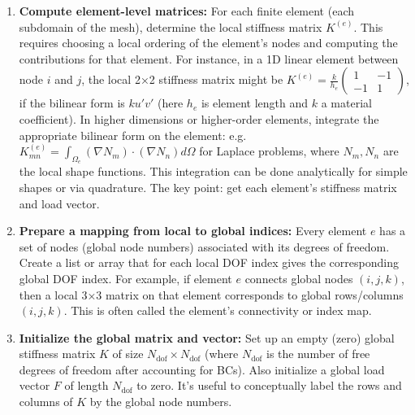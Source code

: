 \documentclass[a4paper,11pt]{report}
\begin{document}
\begin{enumerate}
    \item \textbf{Compute element-level matrices:} For each finite element (each subdomain of the mesh), determine the local stiffness matrix $K^{(e)}$. This requires choosing a local ordering of the element's nodes and computing the contributions for that element. For instance, in a 1D linear element between node $i$ and $j$, the local 2×2 stiffness matrix might be $K^{(e)} = \frac{k}{h_e} \begin{pmatrix} 1 & -1 \\ -1 & 1 \end{pmatrix}$, if the bilinear form is $k u'v'$ (here $h_e$ is element length and $k$ a material coefficient). In higher dimensions or higher-order elements, integrate the appropriate bilinear form on the element: e.g. $K^{(e)}_{mn} = \int_{\Omega_e} (\nabla N_m)\cdot(\nabla N_n) d\Omega$ for Laplace problems, where $N_m, N_n$ are the local shape functions. This integration can be done analytically for simple shapes or via quadrature. The key point: get each element's stiffness matrix and load vector.

    \item \textbf{Prepare a mapping from local to global indices:} Every element $e$ has a set of nodes (global node numbers) associated with its degrees of freedom. Create a list or array that for each local DOF index gives the corresponding global DOF index. For example, if element $e$ connects global nodes $(i, j, k)$, then a local 3×3 matrix on that element corresponds to global rows/columns $(i, j, k)$. This is often called the element's connectivity or index map.

    \item \textbf{Initialize the global matrix and vector:} Set up an empty (zero) global stiffness matrix $K$ of size $N_{\text{dof}} \times N_{\text{dof}}$ (where $N_{\text{dof}}$ is the number of free degrees of freedom after accounting for BCs). Also initialize a global load vector $F$ of length $N_{\text{dof}}$ to zero. It's useful to conceptually label the rows and columns of $K$ by the global node numbers.


\end{enumerate}
\end{document}
